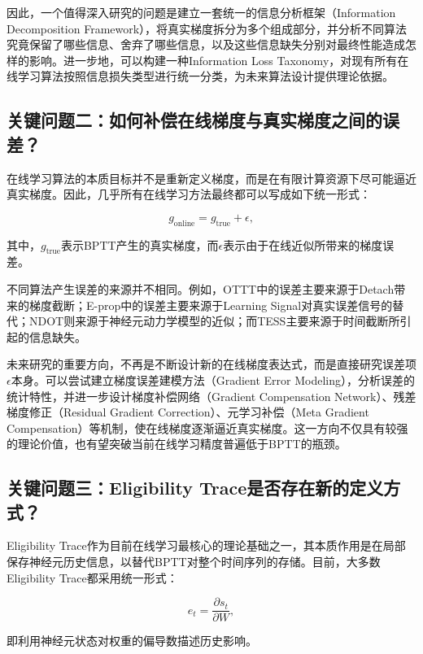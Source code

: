 \documentclass[11pt]{ctexart}
\begin{document}
因此，一个值得深入研究的问题是建立一套统一的信息分析框架（Information Decomposition Framework），将真实梯度拆分为多个组成部分，并分析不同算法究竟保留了哪些信息、舍弃了哪些信息，以及这些信息缺失分别对最终性能造成怎样的影响。进一步地，可以构建一种Information Loss Taxonomy，对现有所有在线学习算法按照信息损失类型进行统一分类，为未来算法设计提供理论依据。


\subsection{关键问题二：如何补偿在线梯度与真实梯度之间的误差？}

在线学习算法的本质目标并不是重新定义梯度，而是在有限计算资源下尽可能逼近真实梯度。因此，几乎所有在线学习方法最终都可以写成如下统一形式：

\[
g_{\mathrm{online}}
=
g_{\mathrm{true}}
+
\epsilon,
\]

其中，$g_{\mathrm{true}}$表示BPTT产生的真实梯度，而$\epsilon$表示由于在线近似所带来的梯度误差。

不同算法产生误差的来源并不相同。例如，OTTT中的误差主要来源于Detach带来的梯度截断；E-prop中的误差主要来源于Learning Signal对真实误差信号的替代；NDOT则来源于神经元动力学模型的近似；而TESS主要来源于时间截断所引起的信息缺失。

未来研究的重要方向，不再是不断设计新的在线梯度表达式，而是直接研究误差项$\epsilon$本身。可以尝试建立梯度误差建模方法（Gradient Error Modeling），分析误差的统计特性，并进一步设计梯度补偿网络（Gradient Compensation Network）、残差梯度修正（Residual Gradient Correction）、元学习补偿（Meta Gradient Compensation）等机制，使在线梯度逐渐逼近真实梯度。这一方向不仅具有较强的理论价值，也有望突破当前在线学习精度普遍低于BPTT的瓶颈。


\subsection{关键问题三：Eligibility Trace是否存在新的定义方式？}

Eligibility Trace作为目前在线学习最核心的理论基础之一，其本质作用是在局部保存神经元历史信息，以替代BPTT对整个时间序列的存储。目前，大多数Eligibility Trace都采用统一形式：

\[
e_t
=
\frac{\partial s_t}{\partial W},
\]

即利用神经元状态对权重的偏导数描述历史影响。
\end{document}
